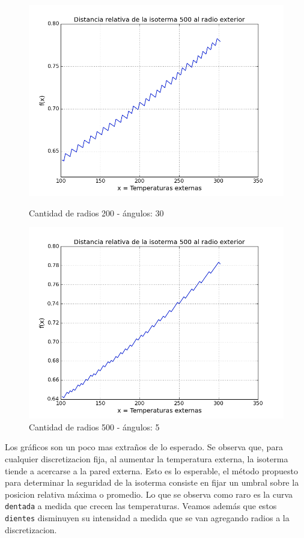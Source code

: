 \begin{figure}[h]
\centering

\includegraphics[scale=0.5]{experimentos1a_1b/evolucion_estimacion_seguridad_isoterma/variacion_30a_200r.png}
\caption{Cantidad de radios 200 - ángulos: 30}

\includegraphics[scale=0.5]{experimentos1a_1b/evolucion_estimacion_seguridad_isoterma/variacion_5a_500r.png}
\caption{Cantidad de radios 500 - ángulos: 5}
\end{figure}
\FloatBarrier

Los gráficos son un poco mas extraños de lo esperado. Se observa que, para cualquier discretizacion fija, al aumentar la temperatura externa, la isoterma tiende a acercarse a la pared externa. Esto es lo esperable, el método propuesto para determinar la seguridad de la isoterma consiste en fijar un umbral sobre la posicion relativa máxima o promedio. Lo que se observa como raro es la curva \texttt{dentada} a medida que crecen las temperaturas. Veamos además que estos \texttt{dientes} disminuyen su intensidad a medida que se van agregando radios a la discretizacion. 

